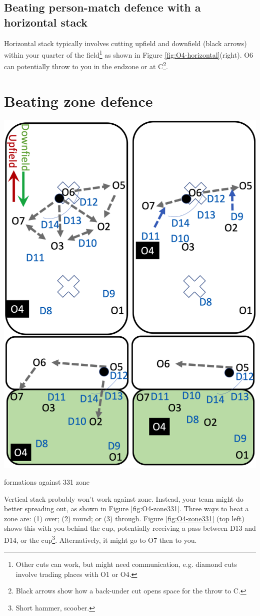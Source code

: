 \documentclass{tufte-handout}
\begin{document}
\subsection{Beating person-match defence with a horizontal stack}\label{sec:horizontall}
Horizontal stack 
typically involves cutting
upfield and downfield (black arrows)
within your quarter of the field\footnote{
Other cuts
can work, 
but might need
communication,
e.g. diamond cuts 
involve trading places 
with O1 
or O4.}
as shown in 
Figure \ref{fig:O4-horizontal}(right).
O6 
can potentially 
throw to you 
in the endzone 
or at C\footnote{
Black arrows
show how a back-under cut 
opens space 
for the throw 
to C.}. 

\section{Beating zone defence}\label{sec:zone}
\begin{marginfigure}%
  \includegraphics[width=\linewidth]{O4-zone331}
  \caption{formations against 331 zone}
  \label{fig:O4-zone331}
\end{marginfigure}
Vertical stack 
probably won't work
against zone. 
Instead, your 
team might do better spreading out, 
as shown 
in Figure \ref{fig:O4-zone331}. 
Three ways to beat a zone are:
(1) over;
(2) round; or
(3) through. 
Figure \ref{fig:O4-zone331}
(top left)
shows this 
with you 
behind the cup, 
potentially receiving a pass 
between 
D13 
and D14, or 
the cup\footnote{
Short hammer, scoober.}.
Alternatively, 
it might go 
to O7 then 
 to you.
\end{document}
